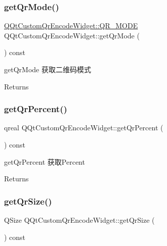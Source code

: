 \subsubsection{\texorpdfstring{get\+Qr\+Mode()}{getQrMode()}}
{\footnotesize\ttfamily \mbox{\hyperlink{class_q_qt_custom_qr_encode_widget_a57caf10e5dda4bb3f138018d083071e6}{Q\+Qt\+Custom\+Qr\+Encode\+Widget\+::\+Q\+R\+\_\+\+M\+O\+DE}} Q\+Qt\+Custom\+Qr\+Encode\+Widget\+::get\+Qr\+Mode (\begin{DoxyParamCaption}{ }\end{DoxyParamCaption}) const}



get\+Qr\+Mode 获取二维码模式 

\begin{DoxyReturn}{Returns}

\end{DoxyReturn}
\mbox{\label{class_q_qt_custom_qr_encode_widget_a4258c5464c9dea89ed3102f3241fedc5}} 
\subsubsection{\texorpdfstring{get\+Qr\+Percent()}{getQrPercent()}}
{\footnotesize\ttfamily qreal Q\+Qt\+Custom\+Qr\+Encode\+Widget\+::get\+Qr\+Percent (\begin{DoxyParamCaption}{ }\end{DoxyParamCaption}) const}



get\+Qr\+Percent 获取\+Percent 

\begin{DoxyReturn}{Returns}

\end{DoxyReturn}
\mbox{\label{class_q_qt_custom_qr_encode_widget_a7631297b67f4c7d0ca59f33aa8a6fa2b}} 
\subsubsection{\texorpdfstring{get\+Qr\+Size()}{getQrSize()}}
{\footnotesize\ttfamily Q\+Size Q\+Qt\+Custom\+Qr\+Encode\+Widget\+::get\+Qr\+Size (\begin{DoxyParamCaption}{ }\end{DoxyParamCaption}) const}



